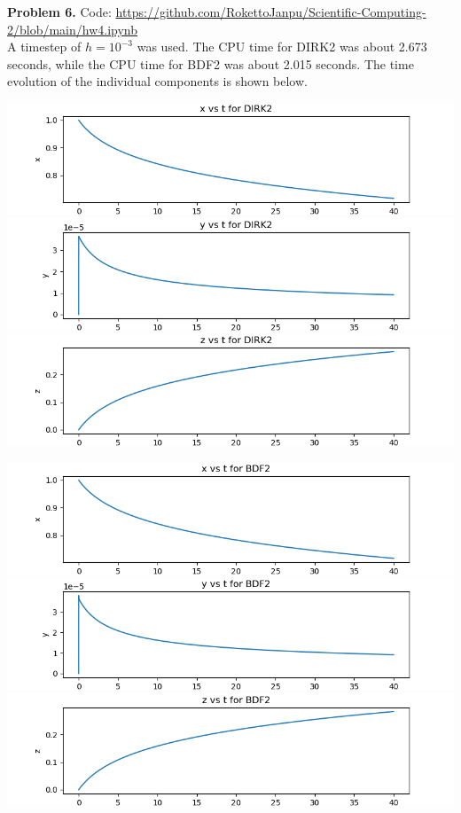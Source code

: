 \documentclass{article}
\def\tbf#1{\textbf{#1}}
\begin{document}
\tbf{Problem 6.} Code: \url{https://github.com/RokettoJanpu/Scientific-Computing-2/blob/main/hw4.ipynb}\\

A timestep of $h=10^{-3}$ was used. The CPU time for DIRK2 was about 2.673 seconds, while the CPU time for BDF2 was about 2.015 seconds. The time evolution of the individual components is shown below.

\begin{center}
	\includegraphics[scale=.25]{hw4 dirk x}
	\includegraphics[scale=.25]{hw4 dirk y}
	\includegraphics[scale=.25]{hw4 dirk z}
\end{center}
\begin{center}
	\includegraphics[scale=.25]{hw4 bdf x}
	\includegraphics[scale=.25]{hw4 bdf y}
	\includegraphics[scale=.25]{hw4 bdf z}
\end{center}
\end{document}
